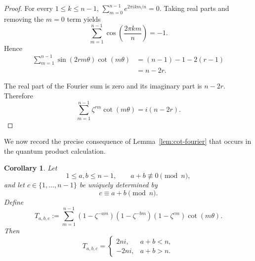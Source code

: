 \documentclass[a4paper,reqno]{amsart}
\theoremstyle{plain} %
\newtheorem{cor}[thm]{Corollary}
\theoremstyle{definition} %
\theoremstyle{remark} %
\newcommand{\1}{\mathds{1}}   %
\begin{document}
\begin{proof}
For every \(1\leq k\leq n-1\), $
\sum\limits_{m=0}^{n-1}
e^{2\pi i km/n}=0.
$
Taking real parts and removing the \(m=0\) term yields
\[
\sum_{m=1}^{n-1}
\cos\left(\frac{2\pi km}{n}\right)
=
-1.
\]
Hence
\begin{align*}
\sum_{m=1}^{n-1}
\sin(2rm\theta)\cot(m\theta)
&=
(n-1)-1-2(r-1)\\
&=
n-2r.
\end{align*}

The real part of the Fourier sum is zero and its imaginary part
is \(n-2r\). Therefore
\[
\sum_{m=1}^{n-1}
\zeta^{rm}\cot(m\theta)
=
i(n-2r).
\]
\end{proof}

We now record the precise consequence of
Lemma~\ref{lem:cot-fourier} that  occurs in the quantum
product calculation.

\begin{cor}\label{cor:T-abc}
Let
\[
1\leq a,b\leq n-1,
\qquad
a+b\not\equiv0\pmod n,
\]
and let \(c\in\{1,\ldots,n-1\}\) be uniquely determined by
\[
c\equiv a+b\pmod n.
\]
Define
\[
T_{a,b,c}
:=
\sum_{m=1}^{n-1}
(1-\zeta^{-am})(1-\zeta^{-bm})(1-\zeta^{cm})
\cot(m\theta).
\]
Then
\[
T_{a,b,c}
=
\begin{cases}
2ni, & a+b<n,\\[2mm]
-2ni, & a+b>n.
\end{cases}
\]
\end{cor}
\end{document}
